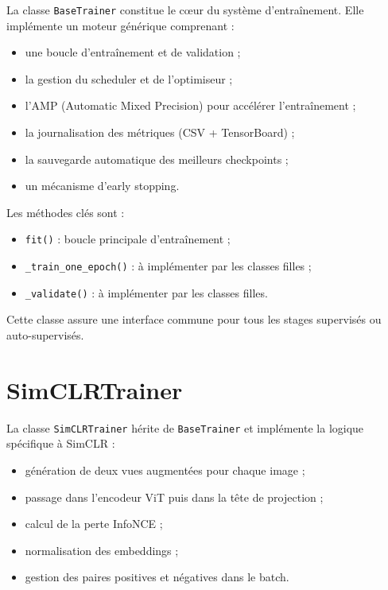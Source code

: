 \documentclass[12pt,a4paper]{report}
\begin{document}
	La classe \texttt{BaseTrainer} constitue le cœur du système d’entraînement. Elle implémente un moteur générique comprenant :
	
	\begin{itemize}
		\item une boucle d’entraînement et de validation ;
		\item la gestion du scheduler et de l’optimiseur ;
		\item l’AMP (Automatic Mixed Precision) pour accélérer l’entraînement ;
		\item la journalisation des métriques (CSV + TensorBoard) ;
		\item la sauvegarde automatique des meilleurs checkpoints ;
		\item un mécanisme d’early stopping.
	\end{itemize}
	
	Les méthodes clés sont :
	
	\begin{itemize}
		\item \texttt{fit()} : boucle principale d’entraînement ;
		\item \texttt{\_train\_one\_epoch()} : à implémenter par les classes filles ;
		\item \texttt{\_validate()} : à implémenter par les classes filles.
	\end{itemize}
	
	Cette classe assure une interface commune pour tous les stages supervisés ou auto-supervisés.
	
	\section{SimCLRTrainer}
	
	La classe \texttt{SimCLRTrainer} hérite de \texttt{BaseTrainer} et implémente la logique spécifique à SimCLR :
	
	\begin{itemize}
		\item génération de deux vues augmentées pour chaque image ;
		\item passage dans l’encodeur ViT puis dans la tête de projection ;
		\item calcul de la perte InfoNCE ;
		\item normalisation des embeddings ;
		\item gestion des paires positives et négatives dans le batch.
	\end{itemize}
	
\end{document}
